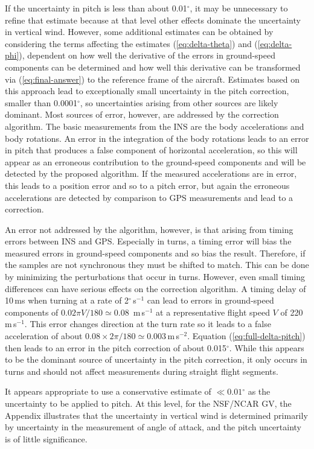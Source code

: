 \documentclass[english,british,amt,bookmarks=false,unicode=true]{copernicus}\usepackage[]{graphicx}\usepackage[]{color}
\begin{document}
If the uncertainty in pitch is less than about 0.01$^{\circ}$, it
may be unnecessary to refine that estimate because at that level other
effects dominate the uncertainty in vertical wind. However, some additional
estimates can be obtained by considering the terms affecting the estimates
(\ref{eq:delta-theta}) and (\ref{eq:delta-phi}), dependent on how
well the derivative of the errors in ground-speed components can be
determined and how well this derivative can be transformed via (\ref{eq:final-answer})
to the reference frame of the aircraft. Estimates based on this approach
lead to exceptionally small uncertainty in the pitch correction, smaller
than 0.0001$^{\circ}$, so uncertainties arising from other sources
are likely dominant. Most sources of error, however, are addressed
by the correction algorithm. The basic measurements from the INS are
the body accelerations and body rotations. An error in the integration
of the body rotations leads to an error in pitch that produces a false
component of horizontal acceleration, so this will appear as an erroneous
contribution to the ground-speed components and will be detected by
the proposed algorithm. If the measured accelerations are in error,
this leads to a position error and so to a pitch error, but again
the erroneous accelerations are detected by comparison to GPS measurements
and lead to a correction. 

An error not addressed by the algorithm, however, is that arising
from timing errors between INS and GPS. Especially in turns, a timing
error will bias the measured errors in ground-speed components and
so bias the result. Therefore, if the samples are not synchronous
they must be shifted to match. This can be done by minimizing the
perturbations that occur in turns. However, even small timing differences
can have serious effects on the correction algorithm. A timing delay
of 10\,ms when turning at a rate of 2$^{\circ}$\,s$^{-1}$ can
lead to errors in ground-speed components of $0.02\pi V/180\simeq$0.08~m\,s$^{-1}$
at a representative flight speed $V$ of 220\,m\,s$^{-1}$. This
error changes direction at the turn rate so it leads to a false acceleration
of about $0.08\times2\pi/180\simeq0.003$\,m\,s$^{-2}$. Equation
(\ref{eq:full-delta-pitch}) then leads to an error in the pitch correction
of about 0.015$^{\circ}$. While this appears to be the dominant source
of uncertainty in the pitch correction, it only occurs in turns and
should not affect measurements during straight flight segments. 

It appears appropriate to use a conservative estimate of $\ll0.01{}^{\circ}$
as the uncertainty to be applied to pitch. At this level, for the
NSF/NCAR GV, the Appendix illustrates that the uncertainty in vertical
wind is determined primarily by uncertainty in the measurement of
angle of attack, and the pitch uncertainty is of little significance.
\end{document}
